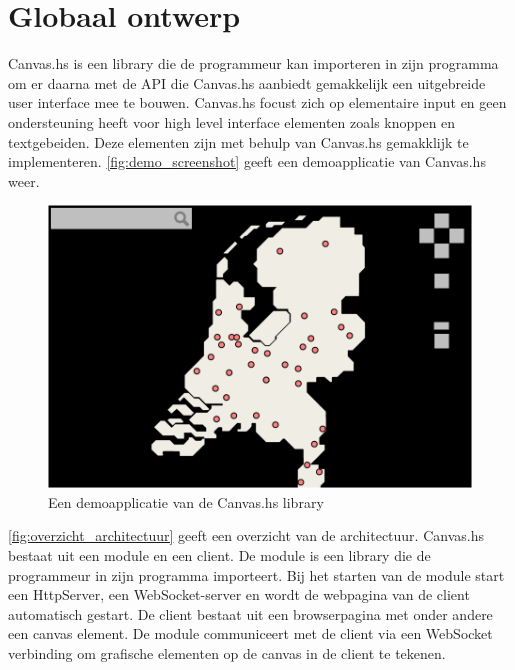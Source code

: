 \section{Globaal ontwerp}  \label{sec:globaal}
Canvas.hs is een library die de programmeur kan importeren in zijn programma om er daarna met de API die Canvas.hs aanbiedt gemakkelijk een uitgebreide user interface mee te bouwen. Canvas.hs focust zich op elementaire input en geen ondersteuning heeft voor high level interface elementen zoals knoppen en textgebeiden. Deze elementen zijn met behulp van Canvas.hs gemakklijk te implementeren. \autoref{fig:demo_screenshot} geeft een demoapplicatie van Canvas.hs weer.



\begin{figure}[H]
\begin{center}
\includegraphics[keepaspectratio,width=\textwidth]{./images/demo.png}
\caption{Een demoapplicatie van de Canvas.hs library}
\label{fig:demo_screenshot}
\end{center}
\end{figure}


\autoref{fig:overzicht_architectuur} geeft een overzicht van de architectuur. Canvas.hs bestaat uit een module en een client. De module is een library die de programmeur in zijn programma importeert. Bij het starten van de module start een HttpServer, een WebSocket-server en wordt de webpagina van de client automatisch gestart. De client bestaat uit een browserpagina met onder andere een canvas element. De module communiceert met de client via een WebSocket verbinding om grafische elementen op de canvas in de client te tekenen.

